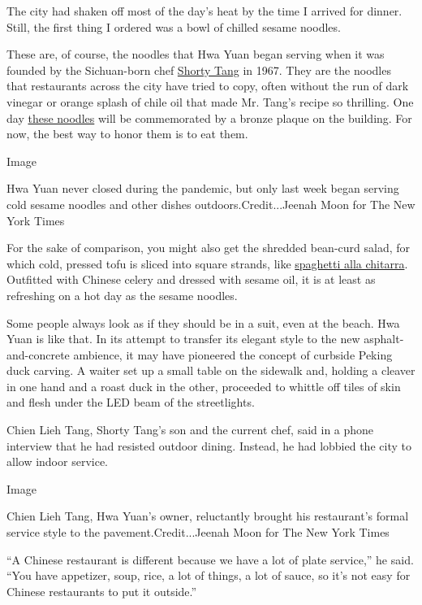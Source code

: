 The city had shaken off most of the day's heat by the time I arrived for
dinner. Still, the first thing I ordered was a bowl of chilled sesame
noodles.

These are, of course, the noodles that Hwa Yuan began serving when it
was founded by the Sichuan-born chef
\href{https://dinersjournal.blogs.nytimes.com/2010/09/30/shorty-tang-sesame-noodle-king-isremembered/}{Shorty
Tang} in 1967. They are the noodles that restaurants across the city
have tried to copy, often without the run of dark vinegar or orange
splash of chile oil that made Mr. Tang's recipe so thrilling. One day
\href{https://cooking.nytimes.com/recipes/9558-takeout-style-sesame-noodles}{these
noodles} will be commemorated by a bronze plaque on the building. For
now, the best way to honor them is to eat them.

Image

Hwa Yuan never closed during the pandemic, but only last week began
serving cold sesame noodles and other dishes outdoors.Credit...Jeenah
Moon for The New York Times

For the sake of comparison, you might also get the shredded bean-curd
salad, for which cold, pressed tofu is sliced into square strands, like
\href{https://www.nytimes.com/2004/05/26/dining/a-guitar-that-makes-beautiful-pasta.html}{spaghetti
alla chitarra}. Outfitted with Chinese celery and dressed with sesame
oil, it is at least as refreshing on a hot day as the sesame noodles.

Some people always look as if they should be in a suit, even at the
beach. Hwa Yuan is like that. In its attempt to transfer its elegant
style to the new asphalt-and-concrete ambience, it may have pioneered
the concept of curbside Peking duck carving. A waiter set up a small
table on the sidewalk and, holding a cleaver in one hand and a roast
duck in the other, proceeded to whittle off tiles of skin and flesh
under the LED beam of the streetlights.

Chien Lieh Tang, Shorty Tang's son and the current chef, said in a phone
interview that he had resisted outdoor dining. Instead, he had lobbied
the city to allow indoor service.

Image

Chien Lieh Tang, Hwa Yuan's owner, reluctantly brought his restaurant's
formal service style to the pavement.Credit...Jeenah Moon for The New
York Times

``A Chinese restaurant is different because we have a lot of plate
service,'' he said. ``You have appetizer, soup, rice, a lot of things, a
lot of sauce, so it's not easy for Chinese restaurants to put it
outside.''

